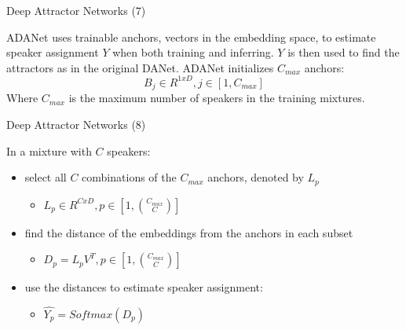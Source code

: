 \documentclass[11pt]{beamer}
\begin{document}
\begin{frame}{Deep Attractor Networks (7)}

ADANet uses trainable anchors, vectors in the embedding space, to estimate speaker assignment $Y$ when both training and inferring. $Y$ is then used to find the attractors as in the original DANet. 
\linebreak
\linebreak
ADANet initializes $C_{max}$ anchors:
\linebreak
\begin{equation}
B_j \in R^{1xD}, j \in [1, C_{max}]
\end{equation}
Where $C_{max}$ is the maximum number of speakers in the training mixtures.
\end{frame}

\begin{frame}{Deep Attractor Networks (8)}

In a mixture with $C$ speakers:
\begin{itemize}
\item select all $C$ combinations of the $C_{max}$ anchors, denoted by $L_p$
\begin{itemize}
\item $L_p \in R^{CxD}, p \in [1, {C_{max} \choose C}]$
\end{itemize}
\item find the distance of the embeddings from the anchors in each subset
\begin{itemize}
\item $D_p = L_pV^T, p \in [1, {C_{max} \choose C}]$
\end{itemize}
\item use the distances to estimate speaker assignment:
\begin{itemize}
\item $\hat{Y_{p}} = Softmax(D_p)$
\end{itemize}
\end{itemize}
\end{frame}
\end{document}
